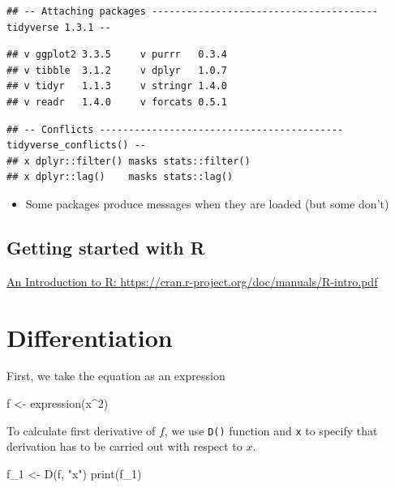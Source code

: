 \documentclass[
]{book}
\newenvironment{Shaded}{\begin{snugshade}}{\end{snugshade}}
\newcommand{\DecValTok}[1]{\textcolor[rgb]{0.00,0.00,0.81}{#1}}
\newcommand{\FunctionTok}[1]{\textcolor[rgb]{0.00,0.00,0.00}{#1}}
\newcommand{\NormalTok}[1]{#1}
\newcommand{\OtherTok}[1]{\textcolor[rgb]{0.56,0.35,0.01}{#1}}
\newcommand{\SpecialCharTok}[1]{\textcolor[rgb]{0.00,0.00,0.00}{#1}}
\newcommand{\StringTok}[1]{\textcolor[rgb]{0.31,0.60,0.02}{#1}}
\providecommand{\tightlist}{%
  \setlength{\itemsep}{0pt}\setlength{\parskip}{0pt}}
\begin{document}
\begin{verbatim}
## -- Attaching packages --------------------------------------- tidyverse 1.3.1 --
\end{verbatim}

\begin{verbatim}
## v ggplot2 3.3.5     v purrr   0.3.4
## v tibble  3.1.2     v dplyr   1.0.7
## v tidyr   1.1.3     v stringr 1.4.0
## v readr   1.4.0     v forcats 0.5.1
\end{verbatim}

\begin{verbatim}
## -- Conflicts ------------------------------------------ tidyverse_conflicts() --
## x dplyr::filter() masks stats::filter()
## x dplyr::lag()    masks stats::lag()
\end{verbatim}

\begin{itemize}
\tightlist
\item
  Some packages produce messages when they are loaded (but some don't)
\end{itemize}

\hypertarget{getting-started-with-r}{%
\section{Getting started with R}\label{getting-started-with-r}}

\href{https://cran.r-project.org/doc/manuals/R-intro.pdf}{An Introduction to R: https://cran.r-project.org/doc/manuals/R-intro.pdf}

\hypertarget{differentiation}{%
\chapter{Differentiation}\label{differentiation}}

First, we take the equation as an expression

\begin{Shaded}
\begin{Highlighting}[]
\NormalTok{f }\OtherTok{\textless{}{-}} \FunctionTok{expression}\NormalTok{(x}\SpecialCharTok{\^{}}\DecValTok{2}\NormalTok{)}
\end{Highlighting}
\end{Shaded}

To calculate first derivative of \(f\), we use \texttt{D()} function and \texttt{x} to specify that derivation has to be carried out with respect to
\(x\).

\begin{Shaded}
\begin{Highlighting}[]
\NormalTok{f\_1 }\OtherTok{\textless{}{-}} \FunctionTok{D}\NormalTok{(f, }\StringTok{"x"}\NormalTok{)}
\FunctionTok{print}\NormalTok{(f\_1)}
\end{Highlighting}
\end{Shaded}
\end{document}
